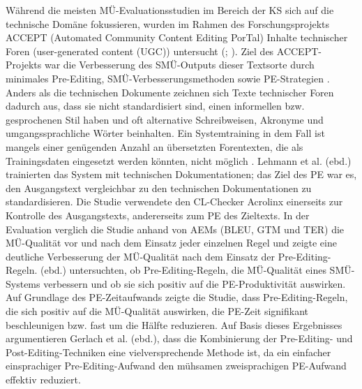 Während die meisten MÜ-Evaluationsstudien im Bereich der KS sich auf die technische Domäne fokussieren, wurden im Rahmen des Forschungsprojekts ACCEPT (Automated Community Content Editing PorTal) Inhalte technischer Foren ({user-generated content} (UGC)) untersucht (\citealt{LehmannEtAl2012}; \citealt{GerlachEtAl2013}). Ziel des ACCEPT-Projekts war die Verbesserung des SMÜ-Outputs dieser Textsorte durch minimales Pre-Editing, SMÜ-Verbesserungsmethoden sowie PE-Strategien \citep{GerlachEtAl2013}. Anders als die technischen Dokumente zeichnen sich Texte technischer Foren dadurch aus, dass sie nicht standardisiert sind, einen informellen bzw. gesprochenen Stil haben und oft alternative Schreibweisen, Akronyme und umgangssprachliche Wörter beinhalten. Ein Systemtraining in dem Fall ist mangels einer genügenden Anzahl an übersetzten Forentexten, die als Trainingsdaten eingesetzt werden könnten, nicht möglich \citep{LehmannEtAl2012}. Lehmann et al. (ebd.) trainierten das System mit technischen Dokumentationen; das Ziel des PE war es, den Ausgangstext vergleichbar zu den technischen Dokumentationen zu standardisieren. Die Studie verwendete den CL-Checker Acrolinx einerseits zur Kontrolle des Ausgangstexts, andererseits zum PE des Zieltexts. In der Evaluation verglich die Studie anhand von AEMs (BLEU, GTM und TER) die MÜ-Qualität vor und nach dem Einsatz jeder einzelnen Regel und zeigte eine deutliche Verbesserung der MÜ-Qualität nach dem Einsatz der Pre-Editing-Regeln. (ebd.) \citet{GerlachEtAl2013} untersuchten, ob Pre-Editing-Regeln, die MÜ-Qualität eines SMÜ-Systems verbessern und ob sie sich positiv auf die PE-Produktivität auswirken. Auf Grundlage des PE-Zeitaufwands zeigte die Studie, dass Pre-Editing-Regeln, die sich positiv auf die MÜ-Qualität auswirken, die PE-Zeit signifikant beschleunigen bzw. fast um die Hälfte reduzieren. Auf Basis dieses Ergebnisses argumentieren Gerlach et al. (ebd.), dass die Kombinierung der Pre-Editing- und Post-Editing-Techniken eine vielversprechende Methode ist, da ein einfacher einsprachiger Pre-Editing-Aufwand den mühsamen zweisprachigen PE-Aufwand effektiv reduziert.

